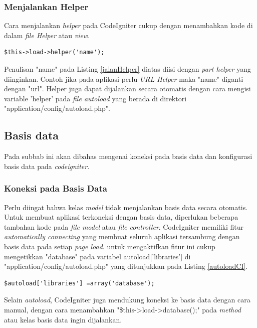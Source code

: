 	\subsubsection{Menjalankan Helper}
	\label{subsub: menjalnkanHelper}
	
	Cara menjalankan \textit{helper} pada CodeIgniter cukup dengan menambahkan kode di dalam \textit{file Helper} atau \textit{view}.
	
	\begin{lstlisting}[caption=Kode Helper, label={jalanHelper}]
$this->load->helper('name');
	\end{lstlisting}
	
	Penulisan "name" pada Listing \ref{jalanHelper} diatas diisi dengan \textit{part helper} yang diinginkan. Contoh jika pada aplikasi perlu \textit{URL Helper} maka "name" diganti dengan "url". Helper juga dapat dijalankan secara otomatis dengan cara mengisi variable 'helper' pada \textit{file autoload} yang berada di direktori "application/config/autoload.php".
	
	\subsection{Basis data}
	\label{sub: database}
	Pada subbab ini akan dibahas mengenai koneksi  pada basis data dan konfigurasi basis data pada \textit{codeigniter}.
	\subsubsection{Koneksi pada Basis Data}
	\label{subsub: connectDatabase}
	
	Perlu diingat bahwa kelas \textit{model} tidak menjalankan basis data secara otomatis. Untuk membuat aplikasi terkoneksi dengan basis data, diperlukan beberapa tambahan kode pada \textit{file model} atau \textit{file controller}.
	CodeIgniter memiliki fitur \textit{automatically connecting} yang membuat seluruh aplikasi tersambung dengan basis data pada setiap \textit{page load}. untuk mengaktifkan fitur ini cukup mengetikkan "database" pada variabel autoload['libraries'] di "application/config/autoload.php" yang ditunjukkan pada Listing \ref{autoloadCI}.
	
	\begin{lstlisting}[caption= Autoload Codeigniter, label= autoloadCI]
$autoload['libraries'] =array('database');
	\end{lstlisting}
	
	Selain \textit{autoload}, CodeIgniter juga mendukung koneksi ke basis data dengan cara manual, dengan cara menambahkan "\$this->load->database();" pada \textit{method} atau kelas basis data ingin dijalankan.
	
